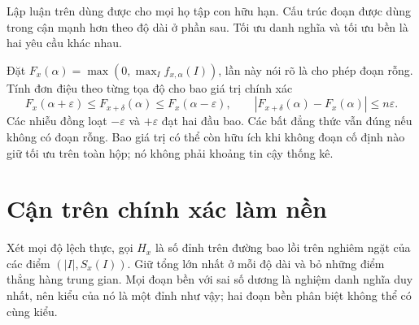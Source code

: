 Lập luận trên dùng được cho mọi họ tập con hữu hạn. Cấu trúc đoạn được dùng trong cận mạnh hơn theo độ dài ở phần sau. Tối ưu danh nghĩa và tối ưu bền là hai yêu cầu khác nhau.


Đặt $F_x(\alpha)=\max(0,\max_I f_{x,\alpha}(I))$, lần này nói rõ là cho phép đoạn rỗng. Tính đơn điệu theo từng tọa độ cho bao giá trị chính xác
\begin{equation}\label{A-eq:value}
F_x(\alpha+\varepsilon)\le F_{x+\delta}(\alpha)\le F_x(\alpha-\varepsilon),
\qquad |F_{x+\delta}(\alpha)-F_x(\alpha)|\le n\varepsilon.
\end{equation}
Các nhiễu đồng loạt $-\varepsilon$ và $+\varepsilon$ đạt hai đầu bao. Các bất đẳng thức vẫn đúng nếu không có đoạn rỗng. Bao giá trị có thể còn hữu ích khi không đoạn cố định nào giữ tối ưu trên toàn hộp; nó không phải khoảng tin cậy thống kê.

\section{Cận trên chính xác làm nền}
Xét mọi độ lệch thực, gọi $H_x$ là số đỉnh trên đường bao lồi trên nghiêm ngặt của các điểm $(|I|,S_x(I))$. Giữ tổng lớn nhất ở mỗi độ dài và bỏ những điểm thẳng hàng trung gian. Mọi đoạn bền với sai số dương là nghiệm danh nghĩa duy nhất, nên kiểu của nó là một đỉnh như vậy; hai đoạn bền phân biệt không thể có cùng kiểu.

